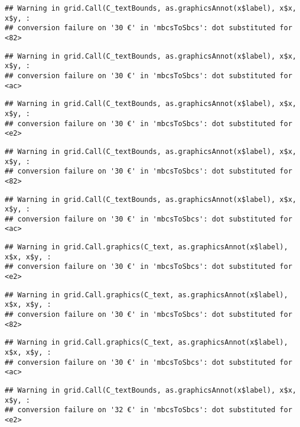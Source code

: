 \documentclass[
]{article}
\begin{document}
\begin{verbatim}
## Warning in grid.Call(C_textBounds, as.graphicsAnnot(x$label), x$x, x$y, :
## conversion failure on '30 €' in 'mbcsToSbcs': dot substituted for <82>
\end{verbatim}

\begin{verbatim}
## Warning in grid.Call(C_textBounds, as.graphicsAnnot(x$label), x$x, x$y, :
## conversion failure on '30 €' in 'mbcsToSbcs': dot substituted for <ac>
\end{verbatim}

\begin{verbatim}
## Warning in grid.Call(C_textBounds, as.graphicsAnnot(x$label), x$x, x$y, :
## conversion failure on '30 €' in 'mbcsToSbcs': dot substituted for <e2>
\end{verbatim}

\begin{verbatim}
## Warning in grid.Call(C_textBounds, as.graphicsAnnot(x$label), x$x, x$y, :
## conversion failure on '30 €' in 'mbcsToSbcs': dot substituted for <82>
\end{verbatim}

\begin{verbatim}
## Warning in grid.Call(C_textBounds, as.graphicsAnnot(x$label), x$x, x$y, :
## conversion failure on '30 €' in 'mbcsToSbcs': dot substituted for <ac>
\end{verbatim}

\begin{verbatim}
## Warning in grid.Call.graphics(C_text, as.graphicsAnnot(x$label), x$x, x$y, :
## conversion failure on '30 €' in 'mbcsToSbcs': dot substituted for <e2>
\end{verbatim}

\begin{verbatim}
## Warning in grid.Call.graphics(C_text, as.graphicsAnnot(x$label), x$x, x$y, :
## conversion failure on '30 €' in 'mbcsToSbcs': dot substituted for <82>
\end{verbatim}

\begin{verbatim}
## Warning in grid.Call.graphics(C_text, as.graphicsAnnot(x$label), x$x, x$y, :
## conversion failure on '30 €' in 'mbcsToSbcs': dot substituted for <ac>
\end{verbatim}

\begin{verbatim}
## Warning in grid.Call(C_textBounds, as.graphicsAnnot(x$label), x$x, x$y, :
## conversion failure on '32 €' in 'mbcsToSbcs': dot substituted for <e2>
\end{verbatim}
\end{document}
